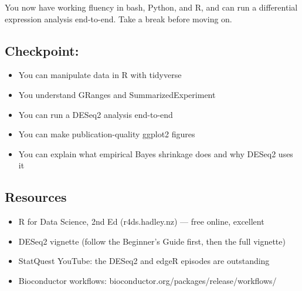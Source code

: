 \begin{restbox}
You now have working fluency in bash, Python, and R, and can run a differential expression analysis end-to-end. Take a break before moving on.
\end{restbox}

\subsection{Checkpoint:}
\begin{itemize}[nosep]
  \item You can manipulate data in R with tidyverse
  \item You understand GRanges and SummarizedExperiment
  \item You can run a DESeq2 analysis end-to-end
  \item You can make publication-quality ggplot2 figures
  \item You can explain what empirical Bayes shrinkage does and why DESeq2 uses it
\end{itemize}

\subsection{Resources}
\begin{itemize}[nosep]
  \item R for Data Science, 2nd Ed (r4ds.hadley.nz) --- free online, excellent
  \item DESeq2 vignette (follow the Beginner's Guide first, then the full vignette)
  \item StatQuest YouTube: the DESeq2 and edgeR episodes are outstanding
  \item Bioconductor workflows: bioconductor.org/packages/release/workflows/
\end{itemize}
